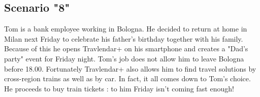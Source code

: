 \subsection{Scenario "8"}

Tom is a bank employee working in Bologna. He decided to return at home in Milan next Friday to celebrate his father's birthday together with his family. Because of this he opens Travlendar+ on his smartphone and creates a "Dad's party" event for Friday night. Tom’s job does not allow him to leave Bologna before 18.00. Fortunately Travlendar+ also allows him to find travel solutions by cross-region trains as well as by car. In fact, it all comes down to Tom's choice. He proceeds to buy train tickets : to him Friday isn’t coming fast enough!